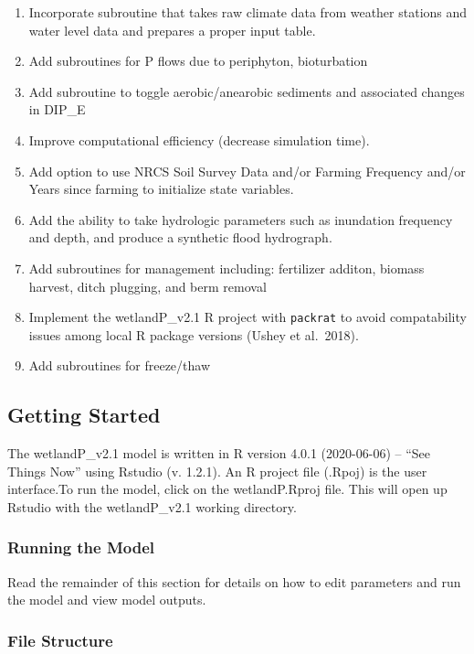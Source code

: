 \documentclass[
]{article}
\providecommand{\tightlist}{%
  \setlength{\itemsep}{0pt}\setlength{\parskip}{0pt}}
\begin{document}
\begin{enumerate}
\def\labelenumi{\arabic{enumi}.}
\tightlist
\item
  Incorporate subroutine that takes raw climate data from weather
  stations and water level data and prepares a proper input table.
\item
  Add subroutines for P flows due to periphyton, bioturbation
\item
  Add subroutine to toggle aerobic/anearobic sediments and associated
  changes in DIP\_E
\item
  Improve computational efficiency (decrease simulation time).
\item
  Add option to use NRCS Soil Survey Data and/or Farming Frequency
  and/or Years since farming to initialize state variables.
\item
  Add the ability to take hydrologic parameters such as inundation
  frequency and depth, and produce a synthetic flood hydrograph.
\item
  Add subroutines for management including: fertilizer additon, biomass
  harvest, ditch plugging, and berm removal
\item
  Implement the wetlandP\_v2.1 R project with \texttt{packrat} to avoid
  compatability issues among local R package versions (Ushey et
  al.~2018).
\item
  Add subroutines for freeze/thaw
\end{enumerate}

\hypertarget{getting-started}{%
\subsection{Getting Started}\label{getting-started}}

The wetlandP\_v2.1 model is written in R version 4.0.1 (2020-06-06) --
``See Things Now'' using Rstudio (v. 1.2.1). An R project file (.Rpoj)
is the user interface.To run the model, click on the wetlandP.Rproj
file. This will open up Rstudio with the wetlandP\_v2.1 working
directory.

\hypertarget{running-the-model}{%
\subsubsection{Running the Model}\label{running-the-model}}

Read the remainder of this section for details on how to edit parameters
and run the model and view model outputs.

\hypertarget{file-structure}{%
\subsubsection{File Structure}\label{file-structure}}
\end{document}

